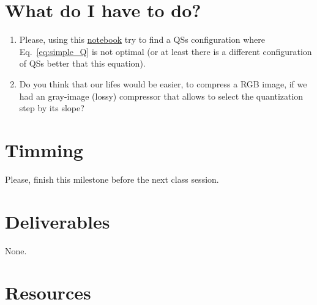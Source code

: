 \section{What do I have to do?}
\begin{enumerate}
\item Please, using this
  \href{https://github.com/Sistemas-Multimedia/Sistemas-Multimedia.github.io/blob/master/milestones/05-RGB_quantization/RGB_quantization.ipynb}{notebook}
  try to find a QSs configuration where Eq.~\ref{eq:simple_Q} is not
  optimal (or at least there is a different configuration of QSs
  better that this equation).
\item Do you think that our lifes would be easier, to compress a RGB
  image, if we had an gray-image (lossy) compressor that allows to
  select the quantization step by its slope?
\end{enumerate}

\section{Timming}

Please, finish this milestone before the next class session.

\section{Deliverables}

None.

\section{Resources}

\renewcommand{\addcontentsline}[3]{}%

